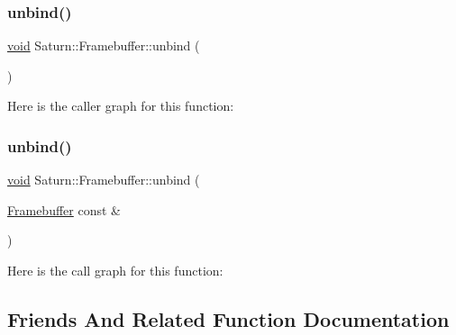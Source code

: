 \mbox{\label{class_saturn_1_1_framebuffer_a57a7e2d21dd704393dcc7718302203ab}} 
\subsubsection{\texorpdfstring{unbind()}{unbind()}\hspace{0.1cm}{\footnotesize\ttfamily [1/2]}}
{\footnotesize\ttfamily \mbox{\hyperlink{glad_8h_a950fc91edb4504f62f1c577bf4727c29}{void}} Saturn\+::\+Framebuffer\+::unbind (\begin{DoxyParamCaption}{ }\end{DoxyParamCaption})\hspace{0.3cm}{\ttfamily [static]}}

Here is the caller graph for this function\+:
\mbox{\label{class_saturn_1_1_framebuffer_a3f77bf8b43788d5c93af0f0f1c1ef904}} 
\subsubsection{\texorpdfstring{unbind()}{unbind()}\hspace{0.1cm}{\footnotesize\ttfamily [2/2]}}
{\footnotesize\ttfamily \mbox{\hyperlink{glad_8h_a950fc91edb4504f62f1c577bf4727c29}{void}} Saturn\+::\+Framebuffer\+::unbind (\begin{DoxyParamCaption}\item[{\mbox{\hyperlink{class_saturn_1_1_framebuffer}{Framebuffer}} const \&}]{ }\end{DoxyParamCaption})\hspace{0.3cm}{\ttfamily [static]}}

Here is the call graph for this function\+:


\subsection{Friends And Related Function Documentation}
\mbox{\label{class_saturn_1_1_framebuffer_a70538530bc36e033e360880ef311df61}} 
